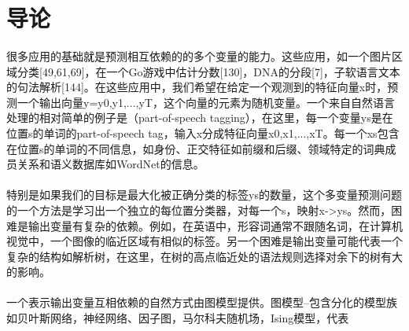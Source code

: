 \documentclass{article}
\begin{document}

\section{导论}

\paragraph{}
很多应用的基础就是预测相互依赖的的多个变量的能力。这些应用，如一个图片区域分类[49,61,69]，在一个Go游戏中估计分数[130]，DNA的分段[7]，子软语言文本的句法解析[144]。在这些应用中，我们希望在给定一个观测到的特征向量x时，预测一个输出向量y={y0,y1,...,yT}，这个向量的元素为随机变量。一个来自自然语言处理的相对简单的例子是（part-of-speech tagging），在这里，每一个变量ys是在位置s的单词的part-of-speech tag，输入x分成特征向量{x0,x1,...,xT}。每一个xs包含在位置s的单词的不同信息，如身份、正交特征如前缀和后缀、领域特定的词典成员关系和语义数据库如WordNet的信息。
\paragraph{}
特别是如果我们的目标是最大化被正确分类的标签ys的数量，这个多变量预测问题的一个方法是学习出一个独立的每位置分类器，对每一个s，映射x->ys。然而，困难是输出变量有复杂的依赖。例如，在英语中，形容词通常不跟随名词，在计算机视觉中，一个图像的临近区域有相似的标签。另一个困难是输出变量可能代表一个复杂的结构如解析树，在这里，在树的高点临近处的语法规则选择对余下的树有大的影响。
\paragraph{}
一个表示输出变量互相依赖的自然方式由图模型提供。图模型--包含分化的模型族如贝叶斯网络，神经网络、因子图，马尔科夫随机场，Ising模型，代表
\end{document}
